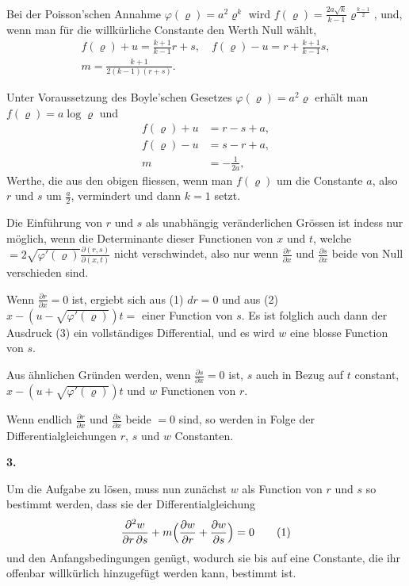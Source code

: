 \documentclass[12pt,a4paper]{article}
\begin{document}
Bei der Poisson'schen Annahme $\varphi(\varrho) = a^{2}\varrho^{k}$ wird $f(\varrho) = \frac{2a\sqrt{k}}{k-1}\varrho^{\frac{k-1}{2}}$, und, wenn man f\"ur die willk\"urliche Constante den Werth Null w\"ahlt,
\begin{align*}
f(\varrho) + u = \frac{k+1}{k-1}r + s,\quad f(\varrho) - u = r + \frac{k+1}{k-1}s,\\
m = \frac{k+1}{2(k-1)(r+s)}.\qquad\qquad\qquad\qquad
\end{align*}

Unter Voraussetzung des Boyle'schen Gesetzes $\varphi(\varrho) = a^{2}\varrho$ erh\"alt man $f(\varrho) = a\log\varrho$ und
\begin{align*}
f(\varrho) + u &= r - s + a,\\
f(\varrho) - u &= s - r + a,\\
m &= -\frac{1}{2a},
\end{align*}
Werthe, die aus den obigen fliessen, wenn man $f(\varrho)$ um die Constante $a$, also $r$ und $s$ um $\frac{a}{2}$, vermindert und dann $k = 1$ setzt.

Die Einf\"uhrung von $r$ und $s$ als unabh\"angig ver\"anderlichen Gr\"ossen ist indess nur m\"oglich, wenn die Determinante dieser Functionen von $x$ und $t$, welche $= 2\sqrt{\varphi'(\varrho)}\frac{\partial(r,s)}{\partial(x,t)}$ nicht verschwindet, also nur wenn $\frac{\partial r}{\partial x}$ und $\frac{\partial s}{\partial x}$ beide von Null verschieden sind.

Wenn $\frac{\partial r}{\partial x} = 0$ ist, ergiebt sich aus (1) $dr = 0$ und aus (2) $x - (u - \sqrt{\varphi'(\varrho)})t =$ einer Function von $s$. Es ist folglich auch dann der Ausdruck (3) ein vollst\"andiges Differential, und es wird $w$ eine blosse Function von $s$.

Aus \"ahnlichen Gr\"unden werden, wenn $\frac{\partial s}{\partial x} = 0$ ist, $s$ auch in Bezug auf $t$ constant, $x - (u + \sqrt{\varphi'(\varrho)})t$ und $w$ Functionen von $r$.

Wenn endlich $\frac{\partial r}{\partial x}$ und $\frac{\partial s}{\partial x}$ beide $= 0$ sind, so werden in Folge der Differentialgleichungen $r$, $s$ und $w$ Constanten.

\newpage
\begin{center}
\textbf{3.}
\end{center}

Um die Aufgabe zu l\"osen, muss nun zun\"achst $w$ als Function von $r$ und $s$ so bestimmt werden, dass sie der Differentialgleichung
\begin{equation*}
\frac{\partial^{2}w}{\partial r\,\partial s} + m\Bigl(\frac{\partial w}{\partial r} + \frac{\partial w}{\partial s}\Bigr) = 0\tag{1}
\end{equation*}
und den Anfangsbedingungen gen\"ugt, wodurch sie bis auf eine Constante, die ihr offenbar willk\"urlich hinzugef\"ugt werden kann, bestimmt ist.
\end{document}
